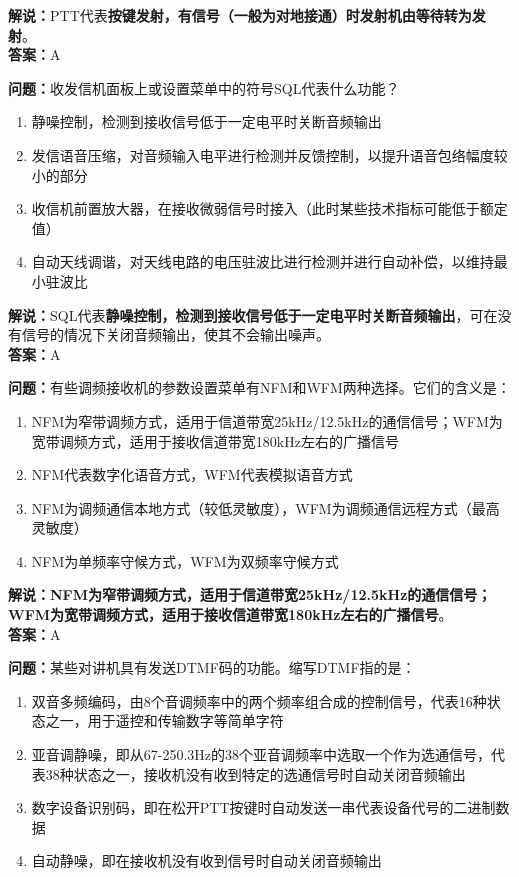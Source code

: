 \textbf{解说：}PTT代表\textbf{按键发射，有信号（一般为对地接通）时发射机由等待转为发射}。\\\textbf{答案：}A%



\textbf{问题：}收发信机面板上或设置菜单中的符号SQL代表什么功能？

\begin{enumerate}[label=\Alph*), leftmargin=1cm]
	\item 静噪控制，检测到接收信号低于一定电平时关断音频输出
	\item 发信语音压缩，对音频输入电平进行检测并反馈控制，以提升语音包络幅度较小的部分
	\item 收信机前置放大器，在接收微弱信号时接入（此时某些技术指标可能低于额定值）
	\item 自动天线调谐，对天线电路的电压驻波比进行检测并进行自动补偿，以维持最小驻波比
\end{enumerate}

\textbf{解说：}SQL代表\textbf{静噪控制，检测到接收信号低于一定电平时关断音频输出}，可在没有信号的情况下关闭音频输出，使其不会输出噪声。\\\textbf{答案：}A%



\textbf{问题：}有些调频接收机的参数设置菜单有NFM和WFM两种选择。它们的含义是：

\begin{enumerate}[label=\Alph*), leftmargin=1cm]
	\item NFM为窄带调频方式，适用于信道带宽25kHz/12.5kHz的通信信号；WFM为宽带调频方式，适用于接收信道带宽180kHz左右的广播信号
	\item NFM代表数字化语音方式，WFM代表模拟语音方式
	\item NFM为调频通信本地方式（较低灵敏度），WFM为调频通信远程方式（最高灵敏度）
	\item NFM为单频率守候方式，WFM为双频率守候方式
\end{enumerate}

\textbf{解说：NFM为窄带调频方式，适用于信道带宽25kHz/12.5kHz的通信信号；WFM为宽带调频方式，适用于接收信道带宽180kHz左右的广播信号}。\\\textbf{答案：}A%



\textbf{问题：}某些对讲机具有发送DTMF码的功能。缩写DTMF指的是：

\begin{enumerate}[label=\Alph*), leftmargin=1cm]
	\item 双音多频编码，由8个音调频率中的两个频率组合成的控制信号，代表16种状态之一，用于遥控和传输数字等简单字符
	\item 亚音调静噪，即从67-250.3Hz的38个亚音调频率中选取一个作为选通信号，代表38种状态之一，接收机没有收到特定的选通信号时自动关闭音频输出
	\item 数字设备识别码，即在松开PTT按键时自动发送一串代表设备代号的二进制数据
	\item 自动静噪，即在接收机没有收到信号时自动关闭音频输出
\end{enumerate}

